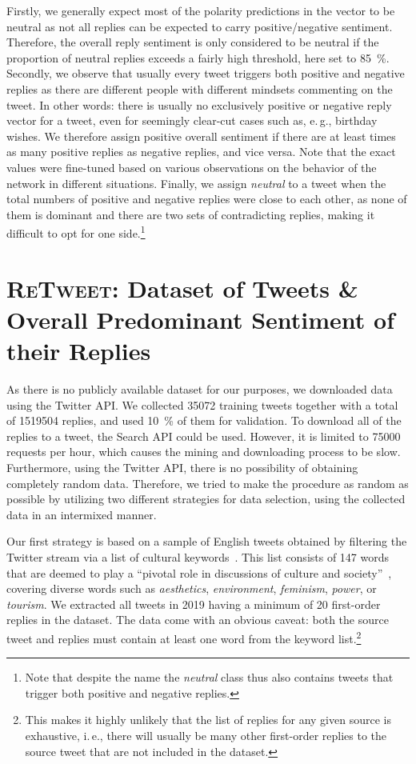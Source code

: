\documentclass[conference]{IEEEtran}
\newcommand{\eg}{e.\,g.,\xspace}
\newcommand{\ie}{i.\,e.,\xspace}
\newcommand{\retweet}{\textsc{ReTweet}\xspace}
\begin{document}
Firstly, we generally expect most of the polarity predictions in the vector to be neutral as not all replies can be expected to carry positive/negative sentiment. Therefore, the overall reply sentiment is only considered to be neutral if the proportion of neutral replies exceeds a fairly high threshold, here set to \SI{85}{\percent}.
Secondly, we observe that usually
every tweet triggers both positive and negative replies as there are different people with different mindsets commenting on the tweet. In other words: there is usually no exclusively positive or negative reply vector for a tweet, even for seemingly clear-cut cases such as, \eg birthday wishes. We therefore assign positive overall sentiment if there are at least  times as many positive replies as negative replies, and vice versa.
Note that the exact values were fine-tuned based on various observations on the behavior of the network in different situations.
Finally, we assign \emph{neutral} to a tweet when the total numbers of positive and negative replies were close to each other, as none of them is dominant and there are two sets of contradicting replies, making it difficult to opt for one side.\footnote{Note that despite the name the \emph{neutral} class thus also contains tweets that trigger both positive and negative replies.}




\section{\retweet: Dataset of Tweets \& Overall Predominant Sentiment of their Replies}
\label{section:data}
As there is no publicly available dataset for our purposes, we downloaded data using the Twitter API. We collected \num{35072} training tweets together with a total of \num{1519504} replies, and used \SI{10}{\percent} of them for validation.
To download all of the replies to a tweet, the Search API could be used. However, it is limited to \num{75000} requests per hour, which causes the mining and downloading process to be slow.
Furthermore, using the Twitter API, there is no possibility of obtaining completely random data. Therefore, we tried to make the procedure as random as possible by utilizing two different strategies for data selection, using the collected data in an intermixed manner.

Our first strategy is based on a sample of English tweets obtained by filtering the Twitter stream via a list of cultural keywords~\cite{bennett2005new}. This list consists of 147 words that are deemed to play a ``pivotal role in discussions of culture and society''~\cite[xvii]{bennett2005new}, covering diverse words such as \emph{aesthetics}, \emph{environment}, \emph{feminism}, \emph{power}, or \emph{tourism}. We extracted all tweets in 2019 having a minimum of 20 first-order replies in the dataset. The data come with an obvious caveat: both the source tweet and replies must contain at least one word from the keyword list.\footnote{This makes it highly unlikely that the list of replies for any given source is exhaustive, \ie there will usually be many other first-order replies to the source tweet that are not included in the dataset.} 
\end{document}
